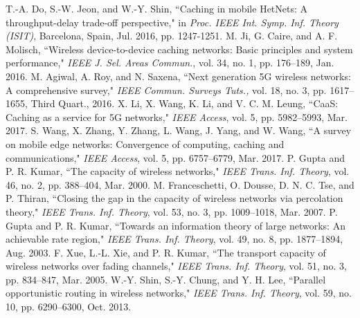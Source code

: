 \documentclass[10pt,journal,compsoc,onecolumn]{IEEEtran}
\begin{document}
\ifCLASSOPTIONcaptionsoff
  \newpage
\fi

\begin{thebibliography}{99}
T.-A. Do, S.-W. Jeon, and W.-Y. Shin, ``Caching in mobile HetNets: A throughput-delay trade-off perspective," in \emph{Proc. IEEE Int. Symp. Inf. Theory (ISIT)}, Barcelona, Spain, Jul. 2016, pp. 1247-1251.
M. Ji, G. Caire, and A. F. Molisch, ``Wireless device-to-device caching networks: Basic principles and system performance," \emph{IEEE J. Sel. Areas Commun.}, vol. 34, no. 1, pp. 176--189, Jan. 2016.
 M. Agiwal, A. Roy, and N. Saxena, ``Next generation 5G wireless networks: A comprehensive survey," \emph{IEEE Commun. Surveys Tuts.,} vol. 18, no. 3, pp. 1617--1655, Third Quart., 2016.
X. Li, X. Wang, K. Li, and V. C. M. Leung, ``CaaS: Caching as a service for 5G networks," \emph{IEEE Access}, vol. 5, pp.  5982--5993, Mar. 2017.
S. Wang, X. Zhang, Y. Zhang, L. Wang, J. Yang, and W. Wang, ``A survey on mobile edge networks: Convergence of computing, caching and communications," \emph{IEEE Access}, vol. 5, pp. 6757--6779, Mar. 2017.
 P. Gupta and P. R. Kumar, ``The capacity of wireless networks," \emph{IEEE Trans. Inf. Theory}, vol. 46, no. 2, pp. 388--404, Mar. 2000.
 M. Franceschetti, O. Dousse, D. N. C. Tse, and P. Thiran, ``Closing the gap in the capacity of wireless networks via percolation theory," \emph{IEEE Trans. Inf. Theory}, vol. 53, no. 3, pp. 1009--1018, Mar. 2007.
 P. Gupta and P. R. Kumar, ``Towards an information theory of large networks: An achievable rate region," \emph{IEEE Trans. Inf. Theory}, vol. 49, no. 8, pp. 1877--1894, Aug. 2003.
 F. Xue, L.-L. Xie, and P. R. Kumar, ``The transport capacity of wireless networks over fading channels," \emph{IEEE Trans. Inf. Theory}, vol. 51, no. 3, pp. 834--847, Mar. 2005.
 W.-Y. Shin, S.-Y. Chung, and Y. H. Lee, ``Parallel opportunistic routing in wireless networks," \emph{IEEE Trans. Inf. Theory}, vol. 59, no. 10, pp. 6290--6300, Oct. 2013.

\end{thebibliography}
\end{document}
